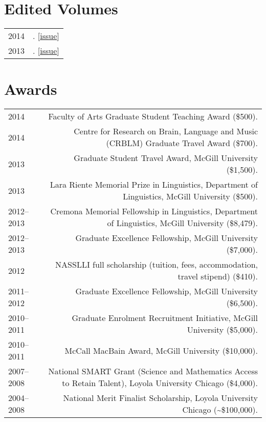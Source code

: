\documentclass[11pt,letterpaper,twoside]{article}
\makeatletter
\newcommand{\myvrule}{\color{lightgray}\vrule width 1.0pt}
\newenvironment{cvsection}{%
  \renewcommand{\arraystretch}{1.75}
  \begin{longtable}[l]{@{} L R @{}}
}{%
  \end{longtable}
}
\newcommand{\award}[2]{%
  #1 (#2). %
}
\makeatother
\begin{document}
\section*{Edited Volumes}

\begin{cvsection}
  2014 & \null{}.
  [\href{https://www.mcgill.ca/mcgwpl/archives/volume-241-2014}{issue}] \\
  2013 & \null{}.
  [\href{https://www.mcgill.ca/mcgwpl/archives/volume-231-2013}{issue}]
\end{cvsection}

\section*{Awards}

\begin{cvsection}
  2014 & \award{Faculty of Arts Graduate Student Teaching Award}{\$500} \\

  2014 & \award{Centre for Research on Brain, Language and Music (CRBLM)
  Graduate Travel Award}{\$700} \\

  2013 & \award{Graduate Student Travel Award, McGill University}{\$1,500} \\

  2013 & \award{Lara Riente Memorial Prize in Linguistics, Department of
  Linguistics, McGill University}{\$500} \\

  2012--2013 & \award{Cremona Memorial Fellowship in Linguistics, Department of
  Linguistics, McGill University}{\$8,479} \\

  2012--2013 & \award{Graduate Excellence Fellowship, McGill
  University}{\$7,000} \\

  2012 & \award{NASSLLI full scholarship (tuition, fees, accommodation, travel
  stipend)}{\$410} \\

  2011--2012 & \award{Graduate Excellence Fellowship, McGill
  University}{\$6,500} \\

  2010--2011 & \award{Graduate Enrolment Recruitment Initiative, McGill
  University}{\$5,000} \\

  2010--2011 & \award{McCall MacBain Award, McGill University}{\$10,000} \\

  2007--2008 & \award{National SMART Grant (Science and Mathematics Access to
  Retain Talent), Loyola University Chicago}{\$4,000} \\

  2004--2008 & \award{National Merit Finalist Scholarship, Loyola University
  Chicago}{\textasciitilde\$100,000} \\
\end{cvsection}
\end{document}
